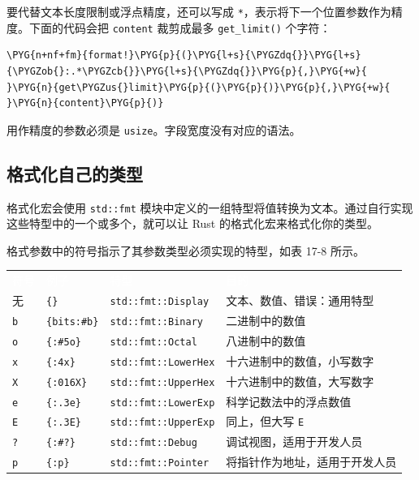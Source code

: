 要代替文本长度限制或浮点精度，还可以写成 \texttt{*}，表示将下一个位置参数作为精度。下面的代码会把 \texttt{content} 裁剪成最多 \texttt{get\_limit()} 个字符：

\begin{Verbatim}[commandchars=\\\{\},breaklines=true,breakanywhere=true,fontsize=\codefont,xleftmargin=17bp]
\PYG{n+nf+fm}{format!}\PYG{p}{(}\PYG{l+s}{\PYGZdq{}}\PYG{l+s}{\PYGZob{}:.*\PYGZcb{}}\PYG{l+s}{\PYGZdq{}}\PYG{p}{,}\PYG{+w}{ }\PYG{n}{get\PYGZus{}limit}\PYG{p}{(}\PYG{p}{)}\PYG{p}{,}\PYG{+w}{ }\PYG{n}{content}\PYG{p}{)}
\end{Verbatim}

用作精度的参数必须是 \texttt{usize}。字段宽度没有对应的语法。

\subsection{格式化自己的类型}

格式化宏会使用 \texttt{std::fmt} 模块中定义的一组特型将值转换为文本。通过自行实现这些特型中的一个或多个，就可以让 Rust 的格式化宏来格式化你的类型。

格式参数中的符号指示了其参数类型必须实现的特型，如表 17-8 所示。


\myTableBegin
\begin{tabularx}{\textwidth}{@{}>{\hsize=0.785\hsize\raggedright\arraybackslash}X>{\hsize=1.055\hsize\raggedright\arraybackslash}X>{\hsize=1.202\hsize\raggedright\arraybackslash}X>{\hsize=0.957\hsize\raggedright\arraybackslash}X@{}}
\rowcolor{tabhead}\textcolor{white}{符号} & \textcolor{white}{例子} & \textcolor{white}{特型} & \textcolor{white}{目的} \\
无 & \texttt{\{\}} & \texttt{std::fmt::Display} & 文本、数值、错误：通用特型 \\
\texttt{b} & \texttt{\{bits:\#b\}} & \texttt{std::fmt::Binary} & 二进制中的数值 \\
\texttt{o} & \texttt{\{:\#5o\}} & \texttt{std::fmt::Octal} & 八进制中的数值 \\
\texttt{x} & \texttt{\{:4x\}} & \texttt{std::fmt::LowerHex} & 十六进制中的数值，小写数字 \\
\texttt{X} & \texttt{\{:016X\}} & \texttt{std::fmt::UpperHex} & 十六进制中的数值，大写数字 \\
\texttt{e} & \texttt{\{:.3e\}} & \texttt{std::fmt::LowerExp} & 科学记数法中的浮点数值 \\
\texttt{E} & \texttt{\{:.3E\}} & \texttt{std::fmt::UpperExp} & 同上，但大写 \texttt{E} \\
\texttt{?} & \texttt{\{:\#?\}} & \texttt{std::fmt::Debug} & 调试视图，适用于开发人员 \\
\texttt{p} & \texttt{\{:p\}} & \texttt{std::fmt::Pointer} & 将指针作为地址，适用于开发人员 \\
\end{tabularx}
\myTableEnd

